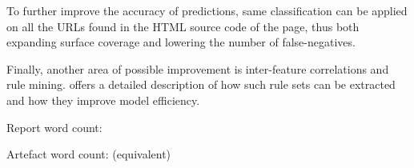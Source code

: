 To further improve the accuracy of predictions, same classification can be applied on all the URLs found in the HTML source code of the page, thus both expanding surface coverage and lowering the number of false-negatives.

Finally, another area of possible improvement is inter-feature correlations and rule mining. \cite{INTELLIGENT_RULE_MINING} offers a detailed description of how such rule sets can be extracted and how they improve model efficiency.


% 

\clearpage
\vspace*{\fill}
\begin{center}
\begin{minipage}{.6\textwidth}
\centering 
Report word count:

Artefact word count: (equivalent)
\end{minipage}
\end{center}
\vfill
\clearpage


\iffalse
The Conclusions chapter marks the end of the project report and it is a summary which brings together many of the points that you have made in other chapters, especially in the previous chapter. It is usually 2 – 3 pages long with three sections:
\begin{enumerate}
	\item Summary: summarise what you have achieved and restate the main results
	\item Evaluation: evaluate what you have achieved and how well you have met the objectives
	\item Future work: explain any limitations and how things might be improved.]
\end{enumerate}

\noindent
[Word count should be included at the end of the last section. Please look at section 5.2 and 5.3 of the Project Handbook for word count policy.]
\newline
Word count (main body of the report): 
\\
Word count (artefact): 

\fi